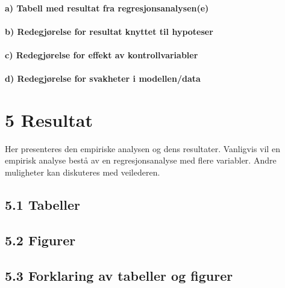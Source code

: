 \documentclass[
  12pt,
  a4paper,
  DIV=11,
  numbers=noendperiod]{scrartcl}
\let\oldparagraph\paragraph
\renewcommand{\paragraph}[1]{\oldparagraph{#1}\mbox{}}
\begin{document}
\paragraph{a) Tabell med resultat fra
regresjonsanalysen(e)}\label{a-tabell-med-resultat-fra-regresjonsanalysene}

\paragraph{b) Redegjørelse for resultat knyttet til
hypoteser}\label{b-redegjuxf8relse-for-resultat-knyttet-til-hypoteser}

\paragraph{c) Redegjørelse for effekt av
kontrollvariabler}\label{c-redegjuxf8relse-for-effekt-av-kontrollvariabler}

\paragraph{d) Redegjørelse for svakheter i
modellen/data}\label{d-redegjuxf8relse-for-svakheter-i-modellendata}

\newpage

\section{5 Resultat}\label{resultat}

Her presenteres den empiriske analysen og dens resultater. Vanligvis vil
en empirisk analyse bestå av en regresjonsanalyse med flere variabler.
Andre muligheter kan diskuteres med veilederen.

\subsection{5.1 Tabeller}\label{tabeller}

\subsection{5.2 Figurer}\label{figurer}

\subsection{5.3 Forklaring av tabeller og
figurer}\label{forklaring-av-tabeller-og-figurer}

\newpage
\end{document}
